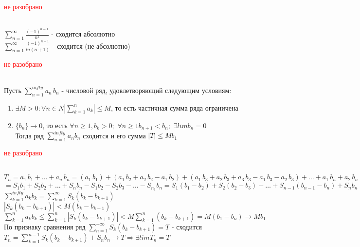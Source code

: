 \textcolor{red}{не разобрано}
\begin{Example}~\\
	$\sum^{\infty}_{n=1} \frac{(-1)^{n-1}}{n^2}$ - сходится абсолютно\\
	$\sum^{\infty}_{n=1} \frac{(-1)^{n-1}}{ln(n+1)}$ - сходится (не абсолютно)\\
\end{Example}

\textcolor{red}{не разобрано}
\begin{Th}~\\
	Пусть $\sum^{infty}_{n=1}a_n\,b_n$ - числовой ряд, удовлетворяющий следующим условиям:
    \begin{enumerate}
        \item $\exists M > 0 : \forall n \in N |\sum^n_{k=1}a_k| \leq M$, то есть частичная сумма ряда ограничена
        
        \item $\{b_n\} \rightarrow 0$, то есть $\forall n \geq 1, b_k > 0;$ $\forall n \geq 1 b_{n+1} < b_n;$ $\exists lim b_n = 0$\\
        Тогда ряд $\sum^{infty}_{n=1}a_nb_n$ сходится и его сумма $|T| \leq Mb_1$
        
    \end{enumerate}
\end{Th}

\textcolor{red}{не разобрано}
\begin{Proof}~\\
	$T_n = a_1\,b_1 + \dots + a_n\,b_n = (a_1\,b_1) + (a_1\,b_2 + a_2\,b_2 - a_1\,b_2) + (a_1\,b_3 + a_2\,b_3 + a_3\,b_3 - a_1\,b_3 - a_2\,b_3) + \dots + a_1\,b_n + a_2\,b_n + \dots + a_n\,b_n - a_1\,b_n - a_2\,b_n - \dots - a_{n_1}\,b_n = $\\
	$ = S_1b_1 + S_2b_2 + \dots + S_nb_n - S_1b_2 - S_2b_3 - \dots - S_{n_1}b_n = S_1(b_1-b_2) + S_2(b_2 - b_3) + \dots + S_{n-1}(b_{n-1} - b_n) + S_nb_n$\\
	$\sum^{infty}_{k=1}a_kb_k = \sum^{\infty}_{k=1} S_k(b_k - b_{k+1})$\\
	$|S_k(b_k - b_{k+1})| < M(b_k - b_{k+1})$\\
	$\sum^{n}_{k=1}a_kb_k \leq \sum^{n}_{k=1} |S_k(b_k - b_{k+1})| < M\sum^{n}_{k=1}(b_k - b_{k+1}) = M(b_1 - b_n) \rightarrow Mb_1$\\
	По признаку сравнения ряд $\sum^{+\infty}_{n=1}S_k(b_k - b_{k+1}) = T$ - сходится\\
	$T_n = \sum^{n-1}_{k=1} S_k(b_k - b_{k+1}) + S_nb_n \rightarrow T \Rightarrow \exists limT_n = T$
\end{Proof}

